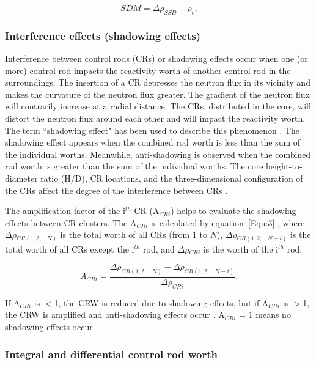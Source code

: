 \begin{equation}
\label{Equ:6}
{SDM}={{\Delta}{\rho}_{SSD}}-{{\rho}_{e}}.
\end{equation}

\subsubsection{Interference effects (shadowing effects)}

Interference between control rods (CRs) or shadowing effects occur when one 
(or more) control rod impacts the reactivity worth of another control rod in 
the surroundings. 
The insertion of a CR depresses the neutron flux
in its vicinity and makes the curvature of the neutron flux greater. The gradient
of the neutron flux will contrarily increase at a radial distance. The CRs, distributed in the core,
will distort the neutron flux around each other and will impact the reactivity worth.
The term ``shadowing effect" has been used to describe this phenomenon \cite{oka2014nuclear}.
The shadowing effect appears when the combined rod worth
is less than the sum of the individual worths. Meanwhile, anti-shadowing is observed 
when the combined rod worth is greater than the sum of the individual worths.
The core height-to-diameter ratio (H/D), CR locations, and the three-dimensional configuration 
of the CRs affect the degree of the interference between CRs \cite{oka2014nuclear}. 

The amplification factor of the i$^{th}$ CR (A$_{CRi}$) helps to evaluate the shadowing effects between CR clusters. The A$_{CRi}$ is calculated by equation~\ref{Equ:3} \cite{vcerba2017optimization}, where $\Delta\rho$$_{CR(1,2,\ldots N)}$ is the total worth of all CRs (from $1$ to $N$), $\Delta\rho$$_{CR(1,2,\ldots N-i)}$ is the total worth of all CRs except the i$^{th}$ rod, and $\Delta\rho$$_{CRi}$ is the worth of the i$^{th}$ rod:

\begin{equation}
\label{Equ:3}
{{A}_{CRi}}=\dfrac{{{\Delta}{\rho}_{CR(1,2,\ldots N)}}-{{\Delta}{\rho}_{CR(1,2,\ldots N-i)}}}{{\Delta}{\rho}_{CRi}}.
\end{equation}

If A$_{CRi}$ is $<$1, the CRW is reduced due to shadowing effects, but if A$_{CRi}$ is $>$1, the CRW is amplified and anti-shadowing effects occur \cite{girardin2007control}. A$_{CRi}$ = 1 means no shadowing effects occur.

\subsubsection{Integral and differential control rod worth}

